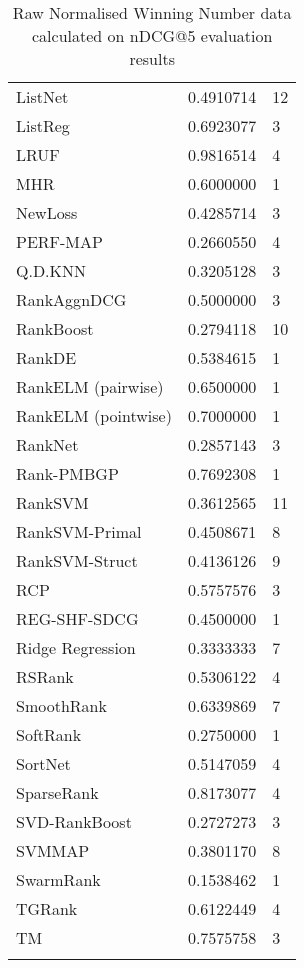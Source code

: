 \begin{longtable}{l|l|l}
ListNet & 0.4910714 & 12 \\ 
ListReg & 0.6923077 & 3 \\ 
LRUF & 0.9816514 & 4 \\ 
MHR & 0.6000000 & 1 \\ 
NewLoss & 0.4285714 & 3 \\ 
PERF-\acs{MAP} & 0.2660550 & 4 \\ 
Q.D.KNN & 0.3205128 & 3 \\ 
RankAgg\acs{nDCG} & 0.5000000 & 3 \\ 
RankBoost & 0.2794118 & 10 \\ 
RankDE & 0.5384615 & 1 \\ 
RankELM (pairwise) & 0.6500000 & 1 \\ 
RankELM (pointwise) & 0.7000000 & 1 \\ 
RankNet & 0.2857143 & 3 \\ 
Rank-PMBGP & 0.7692308 & 1 \\ 
Rank\acs{SVM} & 0.3612565 & 11 \\ 
Rank\acs{SVM}-Primal & 0.4508671 & 8 \\ 
Rank\acs{SVM}-Struct & 0.4136126 & 9 \\ 
RCP & 0.5757576 & 3 \\ 
REG-SHF-SDCG & 0.4500000 & 1 \\ 
Ridge Regression & 0.3333333 & 7 \\ 
RSRank & 0.5306122 & 4 \\ 
SmoothRank & 0.6339869 & 7 \\ 
SoftRank & 0.2750000 & 1 \\ 
SortNet & 0.5147059 & 4 \\ 
SparseRank & 0.8173077 & 4 \\ 
\acs{SVD}-RankBoost & 0.2727273 & 3 \\ 
\acs{SVM}\acs{MAP} & 0.3801170 & 8 \\ 
SwarmRank & 0.1538462 & 1 \\ 
TGRank & 0.6122449 & 4 \\ 
TM & 0.7575758 & 3 \\ 
\caption{Raw Normalised Winning Number data calculated on \acs{nDCG}@5 evaluation results}
\label{tab:raw_data_norm_winnum_ndcg5}
\end{longtable}
